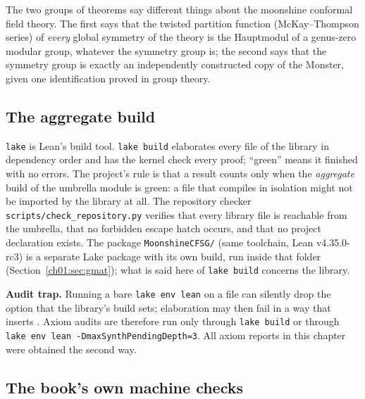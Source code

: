 \begin{physics}
The two groups of theorems say different things about the moonshine conformal field theory. The first says that the
twisted partition function (McKay--Thompson series) of \emph{every} global symmetry of the theory is the Hauptmodul of
a genus-zero modular group, whatever the symmetry group is; the second says that the symmetry group is exactly an
independently constructed copy of the Monster, given one identification proved in group theory.
\end{physics}

\subsection{The aggregate build}

\texttt{lake} is Lean's build tool. \texttt{lake build} elaborates every file of the library in
dependency order and has the kernel check every proof; ``green'' means it finished with no errors.
The project's rule is that a result counts only when the \emph{aggregate} build of the umbrella
module  is green: a file that compiles in isolation might not be imported by the library
at all. The repository checker \texttt{scripts/check\_repository.py} verifies that every library
file is reachable from the umbrella, that no forbidden escape hatch occurs, and that no project
 declaration exists. The package \texttt{MoonshineCFSG/} (same toolchain, Lean v4.35.0-rc3) is a separate
Lake package with its own build, run inside that folder (Section~\ref{ch01:sec:gmat}); what is said here of
\texttt{lake build} concerns the library.

\begin{warning}
\textbf{Audit trap.} Running a bare \texttt{lake env lean} on a file can silently drop the option
 that the library's build sets; elaboration may then fail in a way that
inserts . Axiom audits are therefore run only through \texttt{lake build} or through
\texttt{lake env lean -DmaxSynthPendingDepth=3}. All axiom reports in this chapter were obtained the
second way.
\end{warning}

\subsection{The book's own machine checks}\label{ch01:sec:bookchecks}

